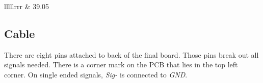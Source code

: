 \begin{table}[h]
\begin{adjustbox}{width=\textwidth,center}
\begin{tabular}{lllllrrr}
                                                                                                                                                                                                                                 & 39.05  \\
        \end{tabular}
    \end{adjustbox}
    \caption{Bill of Materials, all prices in USD.}
    \label{tab:mppcSesnorBOM}
\end{table}


\subsection{Cable}
There are eight pins attached to back of the final board. Those pins break out all signals needed. There is a corner mark on the PCB that lies in the top left corner. On single ended signals, \emph{Sig-} is connected to \emph{GND}.


